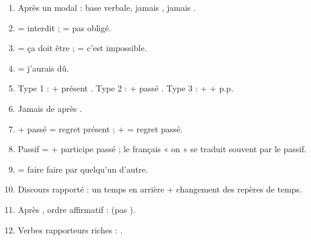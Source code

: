 \begin{memo}
\begin{enumerate}
  \item Après un modal : base verbale, jamais , jamais .
  \item {} = interdit ;  = pas obligé.
  \item {} = ça doit être ;  = c'est impossible.
  \item {} = j'aurais dû.
  \item Type 1 :  + présent \ra {}. Type 2 :  + passé \ra {}.
  Type 3 :  +  \ra {} + p.p.
  \item Jamais de  après .
  \item {} + passé = regret présent ;  +  = regret passé.
  \item Passif =  + participe passé ; le français « on » se traduit souvent par le passif.
  \item {} = faire faire par quelqu'un d'autre.
  \item Discours rapporté : un temps en arrière + changement des repères de temps.
  \item Après , ordre affirmatif :  (pas ).
  \item Verbes rapporteurs riches : .
\end{enumerate}
\end{memo}
